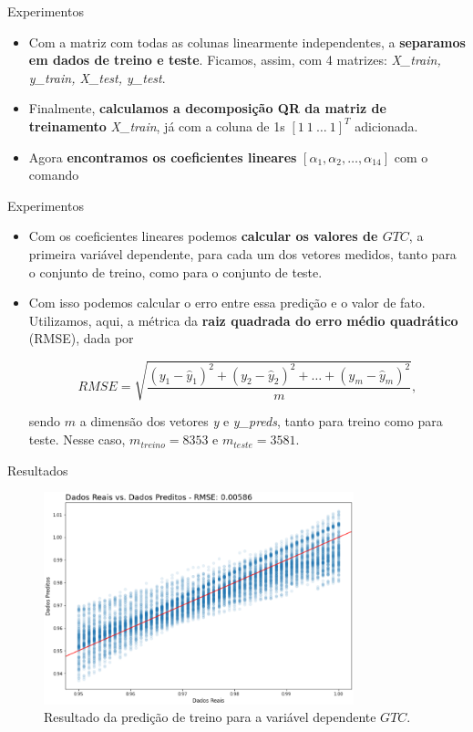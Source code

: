 \documentclass{beamer}
\theoremstyle{definition}
\begin{document}
\begin{frame}{Experimentos}
\justifying
\begin{itemize}
    \item Com a matriz com todas as colunas linearmente independentes, a \textbf{separamos em dados de treino e teste}. Ficamos, assim, com 4 matrizes: \textit{X\_train, y\_train, X\_test, y\_test}.
    \pause
    \item Finalmente, \textbf{calculamos a decomposição QR da matriz de treinamento} \textit{X\_train}, já com a coluna de 1s $[1\ 1\ \ldots\ 1]^T$ adicionada.
    \pause
    \item Agora \textbf{encontramos os coeficientes lineares} $[\alpha_1, \alpha_2, \ldots, \alpha_{14}]$ com o comando\\ 
\end{itemize}

\end{frame}

\begin{frame}{Experimentos}
\justifying
\begin{itemize}
    \item Com os coeficientes lineares podemos \textbf{calcular os valores de $GTC$}, a primeira variável dependente, para cada um dos vetores medidos, tanto para o conjunto de treino, como para o conjunto de teste.
    \item Com isso podemos calcular o erro entre essa predição e o valor de fato. Utilizamos, aqui, a métrica da \textbf{raiz quadrada do erro médio quadrático} (RMSE), dada por
\pause

\begin{equation*}
\label{eqn:rmse}
RMSE = \sqrt{\frac{(y_1 - \hat{y}_1)^2 + (y_2 - \hat{y}_2)^2 + \ldots + (y_m - \hat{y}_m)^2}{m}},
\end{equation*}

sendo $m$ a dimensão dos vetores \textit{y} e \textit{y\_preds}, tanto para treino como para teste. Nesse caso, $m_{treino} = 8353$ e $m_{teste} = 3581$.
\end{itemize}

\end{frame}

\begin{frame}{Resultados}
\begin{figure}[h]
  \centering
  \includegraphics[width=9cm]{treinoGT}
  \caption{Resultado da predição de treino para a variável dependente $GTC$.}
  \label{fig:treinoGT}
\end{figure}
\end{frame}
\end{document}
